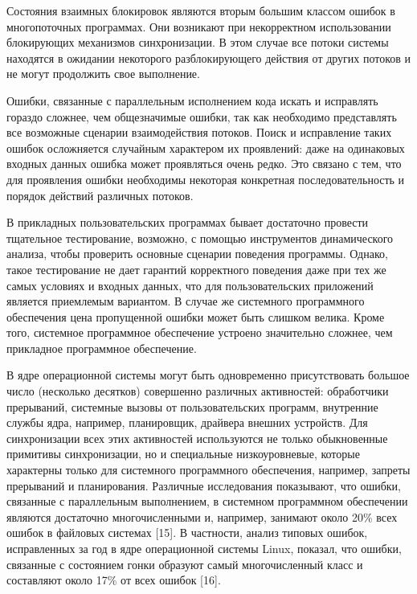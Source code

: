 Состояния взаимных блокировок являются вторым большим классом ошибок в многопоточных программах. Они возникают при некорректном использовании блокирующих механизмов синхронизации. В этом случае все потоки системы находятся в ожидании некоторого разблокирующего действия от других потоков и не могут продолжить свое выполнение. 

Ошибки, связанные с параллельным исполнением кода искать и исправлять гораздо сложнее, чем общезначимые ошибки, так как необходимо представлять все возможные сценарии взаимодействия потоков. Поиск и исправление таких ошибок осложняется случайным характером их проявлений: даже на одинаковых входных данных ошибка может проявляться очень редко. Это связано с тем, что для проявления ошибки необходимы некоторая конкретная последовательность и порядок действий различных потоков. 

В прикладных пользовательских программах бывает достаточно провести тщательное тестирование, возможно, с помощью инструментов динамического анализа, чтобы проверить основные сценарии поведения программы. Однако, такое тестирование не дает гарантий корректного поведения даже при тех же самых условиях и входных данных, что для пользовательских приложений является приемлемым вариантом. В случае же системного программного обеспечения цена пропущенной ошибки может быть слишком велика. Кроме того, системное программное обеспечение устроено значительно сложнее, чем прикладное программное обеспечение. 

В ядре операционной системы могут быть одновременно присутствовать большое число (несколько десятков) совершенно различных активностей: обработчики прерываний, системные вызовы от пользовательских программ, внутренние службы ядра, например, планировщик, драйвера внешних устройств. Для синхронизации всех этих активностей используются не только обыкновенные примитивы синхронизации, но и специальные низкоуровневые, которые характерны только для системного программного обеспечения, например, запреты прерываний и планирования. 
Различные исследования показывают, что ошибки, связанные с параллельным выполнением, в системном программном обеспечении являются достаточно многочисленными и, например, занимают около 20\% всех ошибок в файловых системах [15]. В частности, анализ типовых ошибок, исправленных за год в ядре операционной системы Linux, показал, что ошибки, связанные с состоянием гонки образуют самый многочисленный класс и составляют около 17\% от всех ошибок [16]. 



